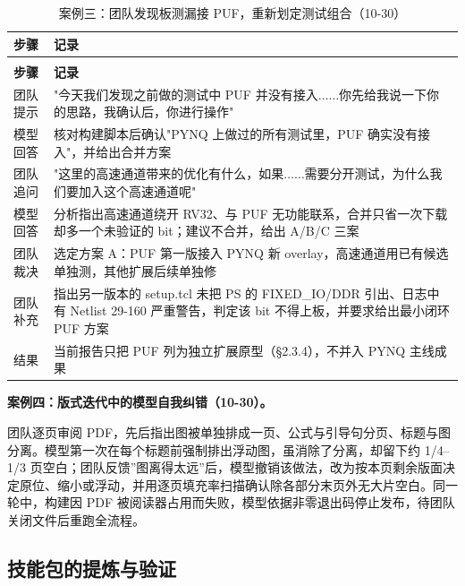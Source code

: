 {\small
\renewcommand{\thetable}{2-23}
\begin{longtable}{@{}>{\raggedright\arraybackslash}p{}>{\raggedright\arraybackslash}p{}@{}}
\caption{案例三：团队发现板测漏接 PUF，重新划定测试组合（10-30）}\label{tab:2-23}\\
\toprule
\textbf{步骤} & \textbf{记录} \\
\midrule
\endfirsthead
\multicolumn{2}{@{}l}{\footnotesize 续表 2-23}\\
\toprule
\textbf{步骤} & \textbf{记录} \\
\midrule
\endhead
团队提示 & "今天我们发现之前做的测试中 PUF 并没有接入$\ldots$$\ldots$你先给我说一下你的思路，我确认后，你进行操作" \\
模型回答 & 核对构建脚本后确认"PYNQ 上做过的所有测试里，PUF 确实没有接入"，并给出合并方案 \\
团队追问 & "这里的高速通道带来的优化有什么，如果$\ldots$$\ldots$需要分开测试，为什么我们要加入这个高速通道呢" \\
模型回答 & 分析指出高速通道绕开 RV32、与 PUF 无功能联系，合并只省一次下载却多一个未验证的 bit；建议不合并，给出 A/B/C 三案 \\
团队裁决 & 选定方案 A：PUF 第一版接入 PYNQ 新 overlay，高速通道用已有候选单独测，其他扩展后续单独修 \\
团队补充 & 指出另一版本的 setup.tcl 未把 PS 的 FIXED\_\allowbreak{}IO/DDR 引出、日志中有 Netlist 29-160 严重警告，判定该 bit 不得上板，并要求给出最小闭环 PUF 方案 \\
结果 & 当前报告只把 PUF 列为独立扩展原型（§2.3.4），不并入 PYNQ 主线成果 \\
\bottomrule
\end{longtable}
}

\textbf{案例四：版式迭代中的模型自我纠错（10-30）。}

团队逐页审阅 PDF，先后指出图被单独排成一页、公式与引导句分页、标题与图分离。模型第一次在每个标题前强制排出浮动图，虽消除了分离，却留下约 1/4--1/3 页空白；团队反馈''图离得太远''后，模型撤销该做法，改为按本页剩余版面决定原位、缩小或浮动，并用逐页填充率扫描确认除各部分末页外无大片空白。同一轮中，构建因 PDF 被阅读器占用而失败，模型依据非零退出码停止发布，待团队关闭文件后重跑全流程。

\Needspace{85pt}

\subsection{技能包的提炼与验证}

